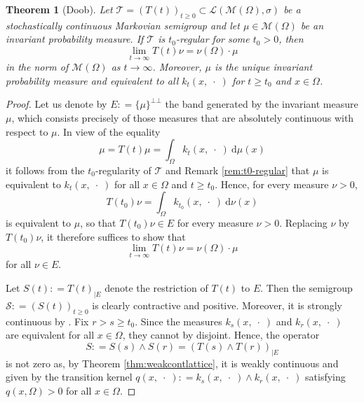 \documentclass{amsart}
\numberwithin{equation}{section}
\newtheorem{thm}{Theorem}[section]
\theoremstyle{remark}
\theoremstyle{definition}
\begin{document}
\begin{thm}[Doob]
\label{thm:doob}
	Let $\mathscr{T}=(T(t))_{t\geq 0} \subset \mathscr{L}(\mathscr{M}(\Omega),\sigma)$ be a stochastically continuous
	Markovian semigroup and let $\mu \in\mathscr{M}(\Omega)$ be an invariant probability measure. If $\mathscr{T}$ is
	$t_0$-regular for some $t_0>0$, then
	\[ \lim_{t\to\infty} T(t)\nu = \nu(\Omega) \cdot \mu\]
	in the norm of $\mathscr{M}(\Omega)$ as $t\to\infty$.
	Moreover, $\mu$ is the unique invariant probability measure 
	and equivalent to all $k_t(x,\;\cdot\;)$ for $t\geq t_0$ and $x\in\Omega$.
\end{thm}
\begin{proof}
	Let us denote by $E{\mathrel{\mathop:}=} \{\mu\}^{\bot\bot}$ the band generated by the invariant measure $\mu$, which 
	consists precisely of those measures that are absolutely continuous with respect to $\mu$.
	In view of the equality
	\[ \mu = T(t)\mu = \int_\Omega k_{t}(x,\;\cdot\; ){\:\mathrm{d}}\mu(x) \]
	it follows from the $t_0$-regularity of $\mathscr{T}$ 
	and Remark \ref{rem:t0-regular} 
	that $\mu$ is equivalent to $k_t(x,\;\cdot\;)$ for all $x\in\Omega$ and $t\geq t_0$.
	Hence, for every measure $\nu>0$,
	\[ T(t_0)\nu= \int_\Omega k_{t_0}(x,\;\cdot\;) {\:\mathrm{d}}\nu(x)\]
	is equivalent to $\mu$, so that  $T(t_0)\nu \in E$ for every measure $\nu >0$.
	Replacing $\nu$ by $T(t_0)\nu$, it therefore suffices to show that
	\[ \lim_{t\to\infty} T(t)\nu = \nu(\Omega) \cdot \mu\]
	for all $\nu\in E$.

	Let $S(t) {\mathrel{\mathop:}=} T(t)_{\mid E}$ denote the restriction of $T(t)$ to $E$. Then
	the semigroup $\mathscr{S} {\mathrel{\mathop:}=} (S(t))_{t\geq 0}$ is clearly contractive and positive.
	Moreover, it is strongly continuous by \cite[Thm 4.6]{hille2009}.
	Fix $r>s\geq t_0$.  Since the measures $k_s(x,\;\cdot\;)$ and $k_r(x,\;\cdot\;)$ are equivalent for all $x\in \Omega$, 
	they cannot by disjoint. Hence, the operator 
	\[ S{\mathrel{\mathop:}=} S(s) \wedge S(r) = ( T(s)\wedge T(r) )_{\mid E}\]
	is not zero
	as, by Theorem \ref{thm:weakcontlattice}, it is weakly continuous and given by the transition kernel 
	$q(x, \;\cdot\;) {\mathrel{\mathop:}=} k_s(x,\;\cdot\;) \wedge k_r(x,\;\cdot\;)$ satisfying $q(x,\Omega)>0$ for all $x\in \Omega$.


\end{proof}
\end{document}
